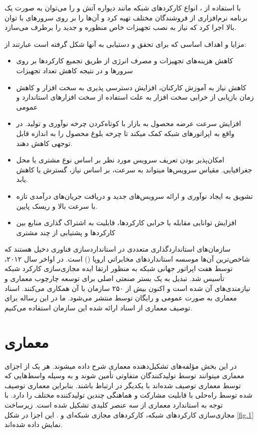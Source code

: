 با استفاده از ، انواع کارکردهای شبکه مانند دیواره آتش و 
را می‌توان به صورت یک برنامه نرم‌افزاری از فروشندگان مختلف تهیه کرد و
آن‌ها را بر روی سرورهای با توان بالا اجرا کرد که نیاز به نصب تجهیزات خاص منظوره و
جدید را برطرف می‌سازد.

مزایا و اهداف اساسی که  برای تحقق و دست‍یابی به آن‍ها شکل گرفته است عبارتند از:

\begin{itemize}
    \item
    کاهش هزینه‌های تجهیزات و مصرف انرژی از طریق تجمیع کارکردها بر روی سرورها و در نتیجه کاهش تعداد تجهیزات
    \item
    کاهش نیاز به آموزش کارکنان، افزایش دسترسی پذیری به سخت افزار و کاهش زمان بازیابی از خرابی سخت افزار به علت استفاده از سخت افزارهای استاندارد و عمومی
    \item
    افزایش سرعت عرضه محصول به بازار با کوتاه‌کردن چرخه نوآوری و تولید. در واقع  به اپراتورهای شبکه کمک می‍کند تا چرخه بلوغ محصول را به اندازه قابل توجهی کاهش دهند.
    \item
    امکان‌پذیر بودن تعریف سرویس مورد نظر بر اساس نوع مشتری یا محل جغرافیایی. مقیاس سرویس‌ها می‍تواند به سرعت، بر اساس نیاز، گسترش یا کاهش یابد.
    \item
    تشویق به ایجاد نوآوری و ارائه سرویس‌های جدید و دریافت جریان‌های درآمدی تازه با سرعت بالا و ریسک پایین.
    \item
    افزایش توانایی  مقابله با خرابی کارکردها، قابلیت به اشتراک گذاری منابع بین کارکردها و پشتیابی از چند مشتری
\end{itemize}

سازمان‌های استانداردگذاری متعددی در استانداردسازی فناوری  دخیل هستند که شاخص‌ترین آن‌ها موسسه استانداردهای مخابراتي اروپا () است.
در اواخر سال ۲۰۱۲،
توسط هفت اپراتور جهانی شبکه به منظور ارتقا ایده مجازی‌سازی کارکرد شبکه تأسیس شد.
تبدیل به یک بستر صنعتی اصلی برای توسعه چارچوب معماری  و نیازمندی‌های آن شده است و اکنون بیش از ۲۵۰ سازمان با آن همکاری می‌کنند.
اسناد معماری  به صورت عمومی و رایگان توسط  منتشر می‌شود.
ما در این رساله برای توصیف معماری  از اسناد ارائه شده این سازمان استفاده می‌کنیم.

\section{معماری }

در این بخش مؤلفه‌های تشکیل‌دهنده معماری  شرح داده می‍شوند.
هر یک از اجزای معماری می‍توانند توسط تولیدکنندگان متفاوتی تأمین شوند و به وسیله واسط‌هایی که توسط معماری 
توصیف شده‌اند با یکدیگر در ارتباط باشند.
بنابراین معماری  توصیف شده توسط  راه‌حلی با قابلیت مشارکت و هماهنگی چندین تولیدکننده مختلف را دارد.
با توجه به استاندارد  معماری 
از سه عنصر کلیدی تشکیل شده است.
زیرساخت مجازی‌سازی کارکردهای شبکه،
کارکردهای مجازی شبکه‌ای و
.
این اجزا در شکل \ref{fig.1} نمایش داده شده‌اند.

